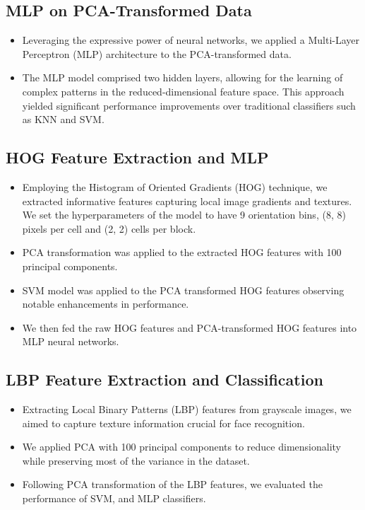 \documentclass[a4paper]{article}
\theoremstyle{plain}
\theoremstyle{definition}
\begin{document}
\subsection{MLP on PCA-Transformed Data}
   \begin{itemize}
       \item Leveraging the expressive power of neural networks, we applied a Multi-Layer Perceptron (MLP) architecture to the PCA-transformed data.
       \item The MLP model comprised two hidden layers, allowing for the learning of complex patterns in the reduced-dimensional feature space. This approach yielded significant performance improvements over traditional classifiers such as KNN and SVM.
   \end{itemize}

\subsection{HOG Feature Extraction and MLP}
   \begin{itemize}
       \item Employing the Histogram of Oriented Gradients (HOG) technique, we extracted informative features capturing local image gradients and textures. We set the hyperparameters of the model to have 9 orientation bins, (8, 8) pixels per cell and (2, 2) cells per block.
       \item PCA transformation was applied to the extracted HOG features with 100 principal components.
       \item SVM model was applied to the PCA transformed HOG features observing notable enhancements in performance.
       \item We then fed the raw HOG features and PCA-transformed HOG features into MLP neural networks.
   \end{itemize}

\subsection{LBP Feature Extraction and Classification}
   \begin{itemize}
       \item Extracting Local Binary Patterns (LBP) features from grayscale images, we aimed to capture texture information crucial for face recognition.
       \item We applied PCA with 100 principal components to reduce dimensionality while preserving most of the variance in the dataset.
       \item Following PCA transformation of the LBP features, we evaluated the performance of SVM, and MLP classifiers.
   \end{itemize}
\end{document}
